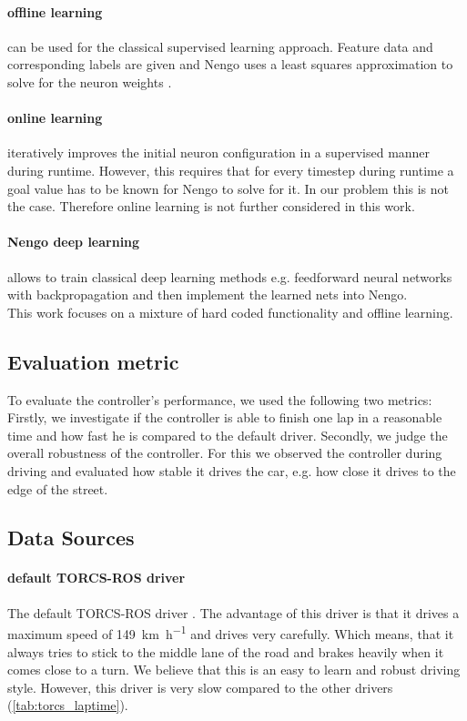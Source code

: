 \documentclass[10pt,a4paper,twoside,journal]{IEEEtran}
\begin{document}
\paragraph{offline learning} can be used for the classical supervised learning approach. Feature data and corresponding labels are given and Nengo uses a least squares approximation to solve for the neuron weights \cite{nef}.

\paragraph{online learning} iteratively improves the initial neuron configuration in a supervised manner during runtime. However, this requires that for every timestep during runtime a goal value has to be known for Nengo to solve for it. In our problem this is not the case. Therefore online learning is not further considered in this work.

\paragraph{Nengo deep learning} allows to train classical deep learning methods e.g. feedforward neural networks with backpropagation and then implement the learned nets into Nengo. \\
This work focuses on a mixture of hard coded functionality and offline learning.

\subsection{Evaluation metric}
To evaluate the controller's performance, we used the following two metrics: Firstly, we investigate if the controller is able to finish one lap in a reasonable time and how fast he is compared to the default driver. Secondly, we judge the overall robustness of the controller. For this we observed the controller during driving and evaluated how stable it drives the car, e.g. how close it drives to the edge of the street.

\subsection{Data Sources}
\paragraph{default TORCS-ROS driver}
The default TORCS-ROS driver \cite{mirus_torcs-ros_2017}. The advantage of this driver is that it drives a maximum speed of \SI{149}{\km\per\hour} and drives very carefully. Which means, that it always tries to stick to the middle lane of the road and brakes heavily when it comes close to a turn. We believe that this is an easy to learn and robust driving style. However, this driver is very slow compared to the other drivers (\autoref{tab:torcs_laptime}).
\end{document}
